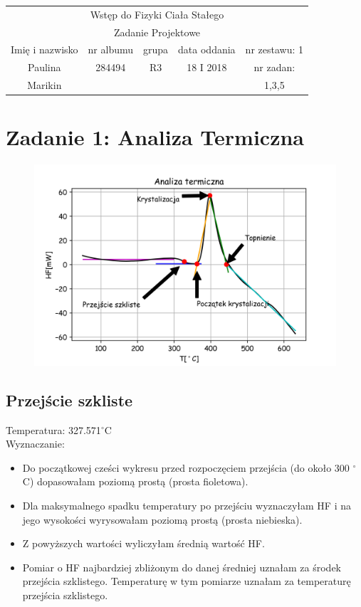 \documentclass[a4paper,10pt]{article}
\def\arraystretch{1.2}
\begin{document}
\begin{table}
  \centering
  \def\arraystretch{1.5}
    \begin{tabular}{|c|c|c|c|c|} \hline
    \multicolumn{5}{|c|}{Wstęp do Fizyki Ciała Stałego}\\
		\multicolumn{5}{|c|}{Zadanie Projektowe} \\\hline
    Imię i nazwisko	&	nr albumu	&	grupa	&	data oddania	&	nr zestawu: 1	\\\hline
				Paulina			&		284494	&		R3	&		18 I 2018		&	nr zadan:  \\
				Marikin			&						&				&								&	1,3,5 \\\hline
  \end{tabular}
\end{table}


\section{Zadanie 1: Analiza Termiczna}

\begin{figure}[H]
	\centering
		\includegraphics[width=\textwidth]{../Analiza_termiczna.png}
\end{figure}

\subsection{Przejście szkliste}
Temperatura: 327.571$^\circ$C \\
Wyznaczanie:
\begin{itemize}
	\item Do początkowej cześci wykresu przed rozpoczęciem przejścia (do około 300 $^\circ$C) dopasowałam poziomą prostą (prosta fioletowa).
	\item Dla maksymalnego spadku temperatury po przejściu wyznaczyłam HF i na jego wysokości wyrysowałam poziomą prostą (prosta niebieska).
	\item Z powyższych wartości wyliczyłam średnią wartość HF.
	\item Pomiar o HF najbardziej zbliżonym do danej średniej uznałam za środek przejścia szklistego. Temperaturę w tym pomiarze uznałam za temperaturę przejścia szklistego.
\end{itemize}
\end{document}
